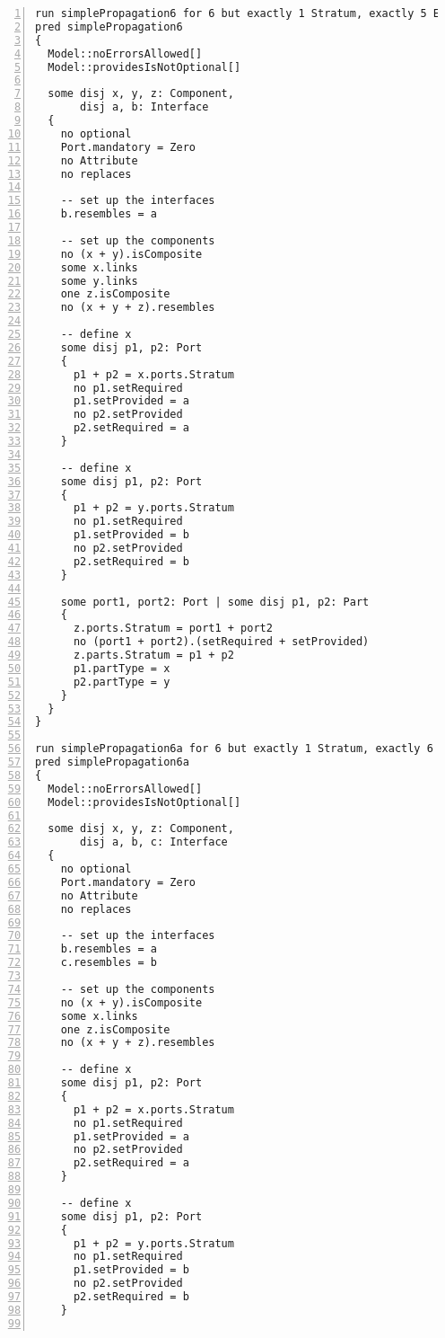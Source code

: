 \begin{lstlisting}[caption={unittests\_inference.als}, numbers=left]
run simplePropagation6 for 6 but exactly 1 Stratum, exactly 5 Element, exactly 6 Port, exactly 2 Part, exactly 3 Component, exactly 2 Interface, exactly 3 Connector, 10 LinkEnd, 6 ConnectorEnd
pred simplePropagation6
{
  Model::noErrorsAllowed[]
  Model::providesIsNotOptional[]

  some disj x, y, z: Component,
       disj a, b: Interface
  {
    no optional
    Port.mandatory = Zero
    no Attribute
    no replaces
  
    -- set up the interfaces
    b.resembles = a    
  
    -- set up the components
    no (x + y).isComposite
    some x.links
    some y.links
    one z.isComposite
    no (x + y + z).resembles
    
    -- define x
    some disj p1, p2: Port
    {
      p1 + p2 = x.ports.Stratum
      no p1.setRequired
      p1.setProvided = a
      no p2.setProvided
      p2.setRequired = a
    }
    
    -- define x
    some disj p1, p2: Port
    {
      p1 + p2 = y.ports.Stratum
      no p1.setRequired
      p1.setProvided = b
      no p2.setProvided
      p2.setRequired = b
    }
    
    some port1, port2: Port | some disj p1, p2: Part
    {
      z.ports.Stratum = port1 + port2
      no (port1 + port2).(setRequired + setProvided)
      z.parts.Stratum = p1 + p2
      p1.partType = x
      p2.partType = y
    }
  }
}

run simplePropagation6a for 6 but exactly 1 Stratum, exactly 6 Element, exactly 6 Port, exactly 2 Part, exactly 3 Component, exactly 3 Interface, exactly 3 Connector, 10 LinkEnd, 6 ConnectorEnd
pred simplePropagation6a
{
  Model::noErrorsAllowed[]
  Model::providesIsNotOptional[]

  some disj x, y, z: Component,
       disj a, b, c: Interface
  {
    no optional
    Port.mandatory = Zero
    no Attribute
    no replaces
  
    -- set up the interfaces
    b.resembles = a
    c.resembles = b
  
    -- set up the components
    no (x + y).isComposite
    some x.links
    one z.isComposite
    no (x + y + z).resembles
    
    -- define x
    some disj p1, p2: Port
    {
      p1 + p2 = x.ports.Stratum
      no p1.setRequired
      p1.setProvided = a
      no p2.setProvided
      p2.setRequired = a
    }
    
    -- define x
    some disj p1, p2: Port
    {
      p1 + p2 = y.ports.Stratum
      no p1.setRequired
      p1.setProvided = b
      no p2.setProvided
      p2.setRequired = b
    }
    

\end{lstlisting}
